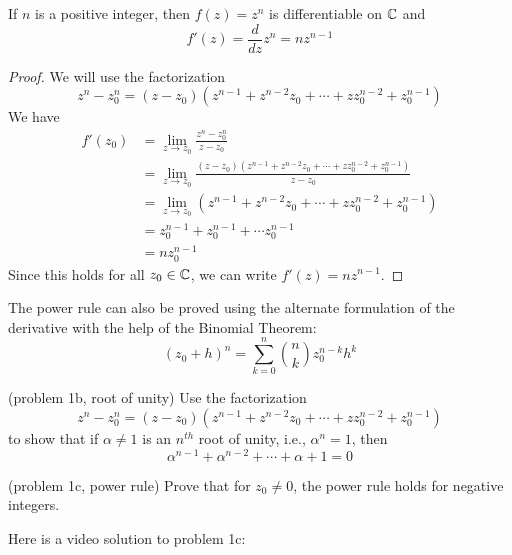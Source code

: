 \documentclass[handout]{ximera}
\begin{document}
\begin{proposition}
If $n$ is a positive integer, then $f(z) = z^n$ is differentiable on $\mathbb C$ and
\[
f'(z) = \frac{d}{dz} z^n = nz^{n-1}
\]
\end{proposition}

\begin{proof}
We will use the factorization
\[
z^n - z_0^n = (z-z_0)\left(z^{n-1} + z^{n-2}z_0 + \cdots + zz_0^{n-2} + z_0^{n-1} \right)
\]
We have
\begin{align*}
f'(z_0) &= \lim_{z \to z_0} \frac{z^n - z_0^n}{z-z_0} \\
        &=\lim_{z \to z_0} \frac{(z-z_0)\left(z^{n-1} + z^{n-2}z_0 + \cdots + zz_0^{n-2} + z_0^{n-1} \right)}{z-z_0} \\
        &= \lim_{z \to z_0} \left(z^{n-1} + z^{n-2}z_0 + \cdots + zz_0^{n-2} + z_0^{n-1} \right)\\
        & = z_0^{n-1} + z_0^{n-1} + \cdots z_0^{n-1}\\
        & = nz_0^{n-1}
\end{align*}
Since this holds for all $z_0 \in \mathbb C$, we can write $f'(z) = nz^{n-1}$.

\end{proof}


\begin{remark}
The power rule can also be proved using the alternate formulation of the derivative with the help of the Binomial Theorem:
\[
(z_0 + h)^n = \sum_{k = 0}^n \binom{n}{k} z_0^{n-k} h^k
\]
\end{remark}


\begin{problem}(problem 1b, root of unity)
Use the factorization 
\[
z^n - z_0^n = (z-z_0)\left(z^{n-1} + z^{n-2}z_0 + \cdots + zz_0^{n-2} + z_0^{n-1} \right)
\]
to show that if $\alpha \neq 1$ is an $n^{th}$ root of unity, i.e., $\alpha^n = 1$, then
\[
\alpha^{n-1} + \alpha^{n-2} + \cdots + \alpha + 1 = 0
\]
\end{problem}

\begin{problem}(problem 1c, power rule)
Prove that for $z_0 \neq 0$, the power rule holds for negative integers.
\end{problem}

Here is a video solution to problem 1c:\\
\begin{foldable}
\end{foldable}
\end{document}
